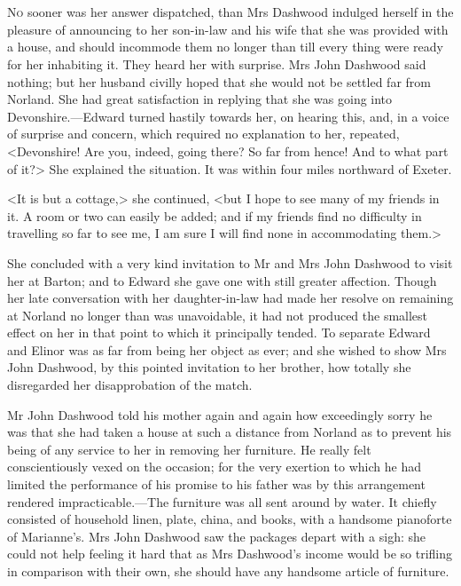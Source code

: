 \chapter[Chapter \thechapter]{}
\lettrine[lraise=0.3]{N}{o} sooner was her answer dispatched, than Mrs Dashwood indulged herself in the pleasure of announcing to her son-in-law and his wife that she was provided with a house, and should incommode them no longer than till every thing were ready for her inhabiting it. They heard her with surprise. Mrs John Dashwood said nothing; but her husband civilly hoped that she would not be settled far from Norland. She had great satisfaction in replying that she was going into Devonshire.—Edward turned hastily towards her, on hearing this, and, in a voice of surprise and concern, which required no explanation to her, repeated, <Devonshire! Are you, indeed, going there? So far from hence! And to what part of it?> She explained the situation. It was within four miles northward of Exeter.

<It is but a cottage,> she continued, <but I hope to see many of my friends in it. A room or two can easily be added; and if my friends find no difficulty in travelling so far to see me, I am sure I will find none in accommodating them.>

She concluded with a very kind invitation to Mr and Mrs John Dashwood to visit her at Barton; and to Edward she gave one with still greater affection. Though her late conversation with her daughter-in-law had made her resolve on remaining at Norland no longer than was unavoidable, it had not produced the smallest effect on her in that point to which it principally tended. To separate Edward and Elinor was as far from being her object as ever; and she wished to show Mrs John Dashwood, by this pointed invitation to her brother, how totally she disregarded her disapprobation of the match.

Mr John Dashwood told his mother again and again how exceedingly sorry he was that she had taken a house at such a distance from Norland as to prevent his being of any service to her in removing her furniture. He really felt conscientiously vexed on the occasion; for the very exertion to which he had limited the performance of his promise to his father was by this arrangement rendered impracticable.—The furniture was all sent around by water. It chiefly consisted of household linen, plate, china, and books, with a handsome pianoforte of Marianne's. Mrs John Dashwood saw the packages depart with a sigh: she could not help feeling it hard that as Mrs Dashwood's income would be so trifling in comparison with their own, she should have any handsome article of furniture.

